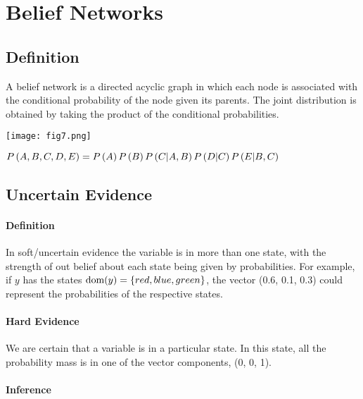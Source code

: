 \section{Belief Networks}
\label{section11.2}

\subsection{Definition}

A belief network is a directed acyclic graph in which each node is associated with the conditional probability of the node given its parents. The joint distribution is obtained by taking the product of the conditional probabilities.

\begin{minipage}{0.4\textwidth}
	\centering
	\texttt{[image: fig7.png]}
\end{minipage}
\begin{minipage}{0.6\textwidth}
	$\P{A,B,C,D,E}=\\ \P{A}\P{B}\P{C|A,B}\P{D|C}\P{E|B,C}$
\end{minipage}

\subsection{Uncertain Evidence}

\paragraph{Definition}

In soft/uncertain evidence the variable is in more than one state, with the strength of out belief about each state being given by probabilities. For example, if $y$ has the states $\dom(y)=\{red,blue,green\}$, the vector (0.6, 0.1, 0.3) could represent the probabilities of the respective states.

\paragraph{Hard Evidence}

We are certain that a variable is in a particular state. In this state, all the probability mass is in one of the vector components, (0, 0, 1).

\paragraph{Inference}

